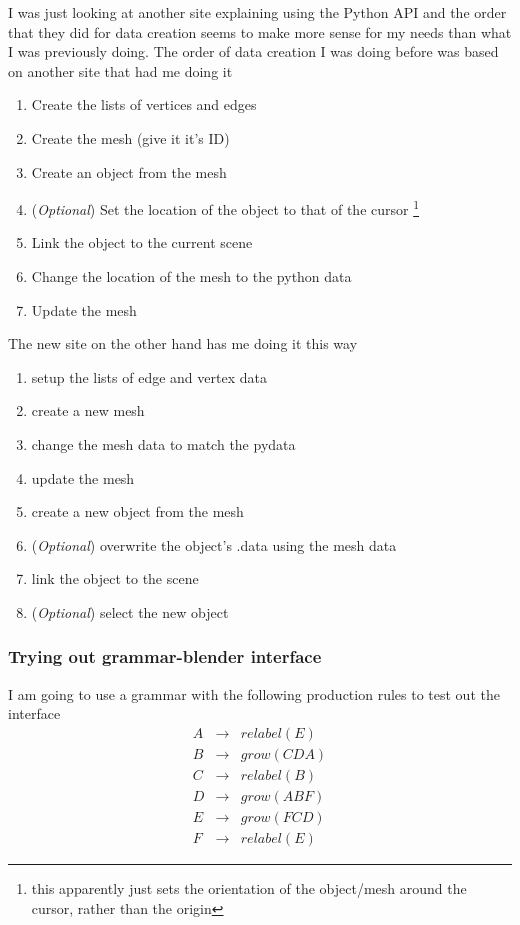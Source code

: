 \documentclass[letterpaper,oneside,titlepage]{article}
\begin{document}
I was just looking at another site explaining using the Python API and the order that they did for data creation seems to make more sense for my needs than what I was previously doing.  The order of data creation I was doing before was based on another site that had me doing it
\begin{enumerate}
\item Create the lists of vertices and edges
\item Create the mesh (give it it's ID)
\item Create an object from the mesh
\item (\emph{Optional}) Set the location of the object to that of the cursor \footnote{this apparently just sets the orientation of the object/mesh around the cursor, rather than the origin}
\item Link the object to the current scene
\item Change the location of the mesh to the python data
\item Update the mesh
\end{enumerate}
The new site on the other hand has me doing it this way
\begin{enumerate}
\item setup the lists of edge and vertex data
\item create a new mesh
\item change the mesh data to match the pydata
\item update the mesh
\item create a new object from the mesh
\item (\emph{Optional}) overwrite the object's .data using the mesh data
\item link the object to the scene
\item (\emph{Optional}) select the new object
\end{enumerate}

\subsubsection{Trying out grammar-blender interface}
I am going to use a grammar with the following production rules to test out the interface
\begin{displaymath}
\begin{matrix}
  A & \to & relabel(E) \\
  B & \to & grow(CDA)  \\
  C & \to & relabel(B) \\
  D & \to & grow(ABF)  \\
  E & \to & grow(FCD)  \\
  F & \to & relabel(E)
\end{matrix}
\end{displaymath}
\end{document}
